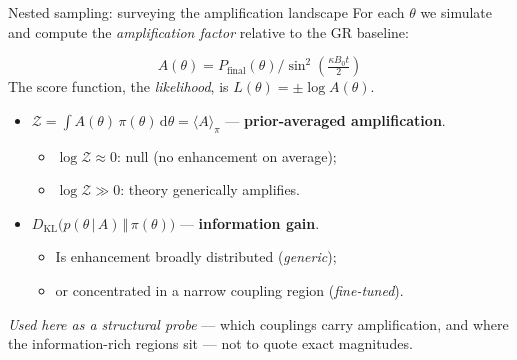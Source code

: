 \begin{frame}{Nested sampling: surveying the amplification landscape}
  For each $\theta$ we simulate and compute the \emph{amplification factor} relative to the GR baseline:

  \vspace{-0.8em}
  {\Large\[
    A(\theta) = P_{\text{final}}(\theta) \Big/ \sin^2\! \left(\tfrac{\kappa B_0 t}{2}\right)
  \]}
  The score function, the \emph{likelihood}, is $L(\theta) = \pm \log A(\theta)$.
  
  \begin{itemize}
    \item $\mathcal{Z} = \int A(\theta)\,\pi(\theta)\,\mathrm{d}\theta = \langle A\rangle_\pi$ ---
      \textbf{prior-averaged amplification}.
      \begin{itemize}
        \item $\log\mathcal{Z}\approx 0$: null (no enhancement on average);
        \item $\log\mathcal{Z} \gg 0$: theory generically amplifies.
      \end{itemize}     

    \item $D_{\mathrm{KL}} \bigl(p(\theta\,|\,A)\,\Vert\,\pi(\theta)\bigr)$ --- \textbf{information gain}.
    \begin{itemize}
      \item Is enhancement broadly distributed (\emph{generic});
      \item or concentrated in a narrow coupling region (\emph{fine-tuned}).
    \end{itemize}
  \end{itemize}

  \emph{Used here as a structural probe} --- which couplings carry amplification, and where the information-rich regions sit --- not to quote exact magnitudes.
\end{frame}
